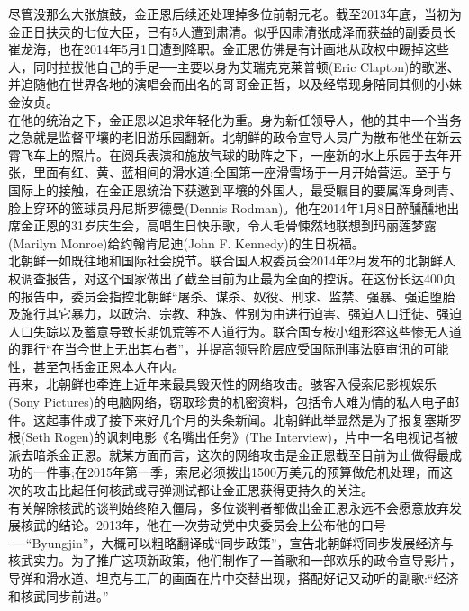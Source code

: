 尽管没那么大张旗鼓，金正恩后续还处理掉多位前朝元老。截至2013年底，当初为金正日扶灵的七位大臣，已有5人遭到肃清。似乎因肃清张成泽而获益的副委员长崔龙海，也在2014年5月1日遭到降职。金正恩仿佛是有计画地从政权中踢掉这些人，同时拉拔他自己的手足──主要以身为艾瑞克克莱普顿(Eric Clapton)的歌迷、并追随他在世界各地的演唱会而出名的哥哥金正哲，以及经常现身陪同其侧的小妹金汝贞。\\

在他的统治之下，金正恩以追求年轻化为重。身为新任领导人，他的其中一个当务之急就是监督平壤的老旧游乐园翻新。北朝鲜的政令宣导人员广为散布他坐在新云霄飞车上的照片。在阅兵表演和施放气球的助阵之下，一座新的水上乐园于去年开张，里面有红、黄、蓝相间的滑水道;全国第一座滑雪场于一月开始营运。至于与国际上的接触，在金正恩统治下获邀到平壤的外国人，最受瞩目的要属浑身刺青、脸上穿环的篮球员丹尼斯罗德曼(Dennis Rodman)。他在2014年1月8日醉醺醺地出席金正恩的31岁庆生会，高唱生日快乐歌，令人毛骨悚然地联想到玛丽莲梦露(Marilyn Monroe)给约翰肯尼迪(John F. Kennedy)的生日祝福。\\

北朝鲜一如既往地和国际社会脱节。联合国人权委员会2014年2月发布的北朝鲜人权调查报告，对这个国家做出了截至目前为止最为全面的控诉。在这份长达400页的报告中，委员会指控北朝鲜“屠杀、谋杀、奴役、刑求、监禁、强暴、强迫堕胎及施行其它暴力，以政治、宗教、种族、性别为由进行迫害、强迫人口迁徒、强迫人口失踪以及蓄意导致长期饥荒等不人道行为。联合国专桉小组形容这些惨无人道的罪行“在当今世上无出其右者”，并提高领导阶层应受国际刑事法庭审讯的可能性，甚至包括金正恩本人在内。\\

再来，北朝鲜也牵连上近年来最具毁灭性的网络攻击。骇客入侵索尼影视娱乐(Sony Pictures)的电脑网络，窃取珍贵的机密资料，包括令人难为情的私人电子邮件。这起事件成了接下来好几个月的头条新闻。北朝鲜此举显然是为了报复塞斯罗根(Seth Rogen)的讽刺电影《名嘴出任务》(The Interview)，片中一名电视记者被派去暗杀金正恩。就某方面而言，这次的网络攻击是金正恩截至目前为止做得最成功的一件事;在2015年第一季，索尼必须拨出1500万美元的预算做危机处理，而这次的攻击比起任何核武或导弹测试都让金正恩获得更持久的关注。\\

有关解除核武的谈判始终陷入僵局，多位谈判者都做出金正恩永远不会愿意放弃发展核武的结论。2013年，他在一次劳动党中央委员会上公布他的口号──“Byungjin”，大概可以粗略翻译成“同步政策”，宣告北朝鲜将同步发展经济与核武实力。为了推广这项新政策，他们制作了一首歌和一部欢乐的政令宣导影片，导弹和滑水道、坦克与工厂的画面在片中交替出现，搭配好记又动听的副歌:“经济和核武同步前进。”\\

